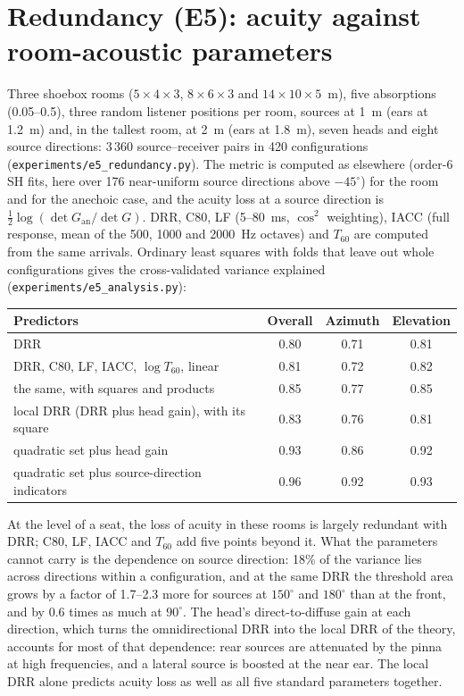 \documentclass[10pt]{article}
\theoremstyle{definition}
\begin{document}
\section{Redundancy (E5): acuity against room-acoustic parameters}
Three shoebox rooms ($5\times4\times3$, $8\times6\times3$ and $14\times10\times5$~m), five absorptions (0.05--0.5), three random listener positions per room, sources at 1~m (ears at 1.2~m) and, in the tallest room, at 2~m (ears at 1.8~m), seven heads and eight source directions: 3\,360 source--receiver pairs in 420 configurations (\texttt{experiments/e5\_redundancy.py}). The metric is computed as elsewhere (order-6 SH fits, here over 176 near-uniform source directions above $-45^\circ$) for the room and for the anechoic case, and the acuity loss at a source direction is $\tfrac12\log(\det G_{\mathrm{an}}/\det G)$. DRR, C80, LF (5--80~ms, $\cos^2$ weighting), IACC (full response, mean of the 500, 1000 and 2000~Hz octaves) and $T_{60}$ are computed from the same arrivals. Ordinary least squares with folds that leave out whole configurations gives the cross-validated variance explained (\texttt{experiments/e5\_analysis.py}):
\begin{center}
\begin{tabular}{lccc}
Predictors & Overall & Azimuth & Elevation\\\hline
DRR & 0.80 & 0.71 & 0.81\\
DRR, C80, LF, IACC, $\log T_{60}$, linear & 0.81 & 0.72 & 0.82\\
the same, with squares and products & 0.85 & 0.77 & 0.85\\
local DRR (DRR plus head gain), with its square & 0.83 & 0.76 & 0.81\\
quadratic set plus head gain & 0.93 & 0.86 & 0.92\\
quadratic set plus source-direction indicators & 0.96 & 0.92 & 0.93\\
\end{tabular}
\end{center}
At the level of a seat, the loss of acuity in these rooms is largely redundant with DRR; C80, LF, IACC and $T_{60}$ add five points beyond it. What the parameters cannot carry is the dependence on source direction: 18\% of the variance lies across directions within a configuration, and at the same DRR the threshold area grows by a factor of 1.7--2.3 more for sources at $150^\circ$ and $180^\circ$ than at the front, and by 0.6 times as much at $90^\circ$. The head's direct-to-diffuse gain at each direction, which turns the omnidirectional DRR into the local DRR of the theory, accounts for most of that dependence: rear sources are attenuated by the pinna at high frequencies, and a lateral source is boosted at the near ear. The local DRR alone predicts acuity loss as well as all five standard parameters together.
\end{document}
